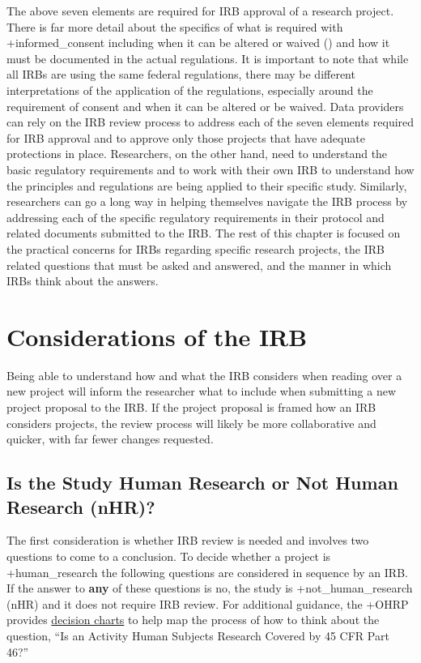 \documentclass[
]{book}
\begin{document}
The above seven elements are required for IRB approval of a research project. There is far more detail about the specifics of what is required with +informed\_consent\textbar{} including when it can be altered or waived (\citet{codeoffederalregulations2017a}) and how it must be documented in the actual regulations. It is important to note that while all IRBs are using the same federal regulations, there may be different interpretations of the application of the regulations, especially around the requirement of consent and when it can be altered or be waived. Data providers can rely on the IRB review process to address each of the seven elements required for IRB approval and to approve only those projects that have adequate protections in place. Researchers, on the other hand, need to understand the basic regulatory requirements and to work with their own IRB to understand how the principles and regulations are being applied to their specific study. Similarly, researchers can go a long way in helping themselves navigate the IRB process by addressing each of the specific regulatory requirements in their protocol and related documents submitted to the IRB.
The rest of this chapter is focused on the practical concerns for IRBs regarding specific research projects, the IRB related questions that must be asked and answered, and the manner in which IRBs think about the answers.

\hypertarget{considerations-of-the-irb}{%
\section{Considerations of the IRB}\label{considerations-of-the-irb}}

Being able to understand how and what the IRB considers when reading over a new project will inform the researcher what to include when submitting a new project proposal to the IRB. If the project proposal is framed how an IRB considers projects, the review process will likely be more collaborative and quicker, with far fewer changes requested.

\hypertarget{is-the-study-human-research-or-not-human-research-nhr}{%
\subsection{Is the Study Human Research or Not Human Research (nHR)?}\label{is-the-study-human-research-or-not-human-research-nhr}}

The first consideration is whether IRB review is needed and involves two questions to come to a conclusion. To decide whether a project is +human\_research\textbar{} the following questions are considered in sequence by an IRB. If the answer to \textbf{any} of these questions is no, the study is +not\_human\_research\textbar{} (nHR) and it does not require IRB review. For additional guidance, the +OHRP\textbar{} provides \href{https://www.hhs.gov/ohrp/regulations-and-policy/decision-charts/index.html}{decision charts} \citep{officeforhumanresearchprotections2020} to help map the process of how to think about the question, ``Is an Activity Human Subjects Research Covered by 45 CFR Part 46?''
\end{document}
